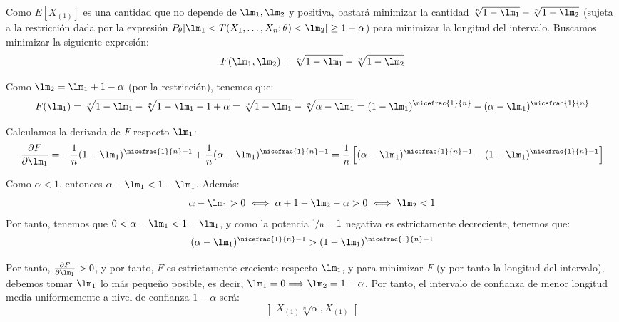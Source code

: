 \begin{ejercicio}
    Como $E[X_{(1)}]$ es una cantidad que no depende de $\lm_1,\lm_2$ y positiva, bastará minimizar la cantidad $\sqrt[n]{1-\lm_1} - \sqrt[n]{1-\lm_2}$ (sujeta a la restricción dada por la expresión $P_\theta[\lm_1<T(X_1, \ldots, X_n;\theta)<\lm_2]\geq 1-\alpha$) para minimizar la longitud del intervalo. Buscamos minimizar la siguiente expresión:
    \begin{equation*}
        F(\lm_1,\lm_2) = \sqrt[n]{1-\lm_1} - \sqrt[n]{1-\lm_2}
    \end{equation*}

    Como $\lm_2=\lm_1 + 1-\alpha$ (por la restricción), tenemos que:
    \begin{equation*}
        F(\lm_1) = \sqrt[n]{1-\lm_1} - \sqrt[n]{1-\lm_1 - 1+\alpha} = \sqrt[n]{1-\lm_1} - \sqrt[n]{\alpha - \lm_1}
        = (1-\lm_1)^{\nicefrac{1}{n}} - (\alpha - \lm_1)^{\nicefrac{1}{n}}
    \end{equation*}

    Calculamos la derivada de $F$ respecto $\lm_1$:
    \begin{equation*}
        \frac{\partial F}{\partial \lm_1} = -\frac{1}{n}(1-\lm_1)^{\nicefrac{1}{n}-1} + \frac{1}{n}(\alpha - \lm_1)^{\nicefrac{1}{n}-1} = \frac{1}{n}\left[(\alpha - \lm_1)^{\nicefrac{1}{n}-1} - (1-\lm_1)^{\nicefrac{1}{n}-1}\right]
    \end{equation*}

    Como $\alpha< 1$, entonces $\alpha - \lm_1 < 1-\lm_1$. Además:
    \begin{equation*}
        \alpha-\lm_1>0\iff \alpha+1-\lm_2-\alpha>0\iff \lm_2<1
    \end{equation*}
    Por tanto, tenemos que $0<\alpha-\lm_1<1-\lm_1$, y como la potencia $\nicefrac{1}{n}-1$ negativa es estrictamente decreciente, tenemos que:
    \begin{equation*}
        (\alpha - \lm_1)^{\nicefrac{1}{n}-1} > (1-\lm_1)^{\nicefrac{1}{n}-1}
    \end{equation*}

    Por tanto, $\frac{\partial F}{\partial \lm_1} > 0$, y por tanto, $F$ es estrictamente creciente respecto $\lm_1$, y para minimizar $F$ (y por tanto la longitud del intervalo), debemos tomar $\lm_1$ lo más pequeño posible, es decir, $\lm_1 = 0 \Longrightarrow \lm_2 = 1-\alpha$. Por tanto, el intervalo de confianza de menor longitud media uniformemente a nivel de confianza $1-\alpha$ será:
    \begin{equation*}
        \left]X_{(1)}\sqrt[n]{\alpha},X_{(1)}\right[
    \end{equation*}
\end{ejercicio}


